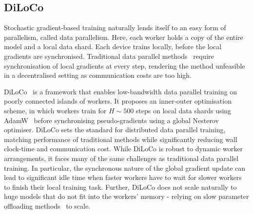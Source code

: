 \documentclass{article}
\begin{document}


\subsection{DiLoCo}

Stochastic gradient-based training naturally lends itself to an easy form of
parallelism, called data parallelism. Here, each worker holds a copy of the
entire model and a local data shard. Each device trains locally, before the local
gradients are synchronised. Traditional data parallel methods~\cite{mcmahan2016}
require synchronisation of local gradients at every step, rendering the method
unfeasible in a decentralised setting as communication costs are too high.

DiLoCo~\cite{douillard2023} is a framework that enables low-bandwidth data
parallel training on poorly connected islands of workers. It proposes an
inner-outer optimisation scheme, in which workers train for $H\sim 500$ steps on
local data shards using AdamW~\cite{loshchilov2019} before synchronising
pseudo-gradients using a global Nesterov optimiser. DiLoCo sets the standard for
distributed data parallel training, matching performance of traditional methods
while significantly reducing wall clock-time and communication cost. While
DiLoCo is robust to dynamic worker arrangements, it faces many of the same
challenges as traditional data parallel training. In particular, the synchronous
nature of the global gradient update can lead to significant idle time when
faster workers have to wait for slower workers to finish their local training
task. Further, DiLoCo does not scale naturally to huge models that do not fit
into the workers' memory - relying on slow parameter offloading
methods~\cite{rhu2016, cui2016} to scale.
\end{document}
